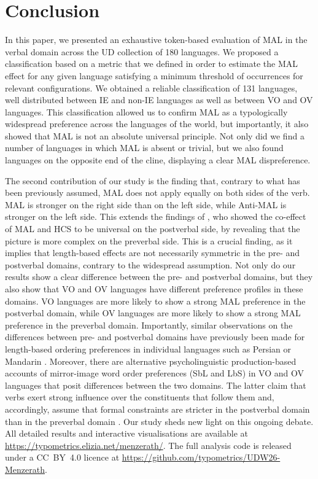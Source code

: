 \section{Conclusion}\label{concl}
In this paper, we presented an exhaustive token-based evaluation of MAL in the verbal domain across the UD collection of 180 languages. We proposed a classification based on a metric that we defined in order to estimate the MAL effect for any given language satisfying a minimum threshold of occurrences for relevant configurations. We obtained a reliable classification of 131 languages, well distributed between IE and non-IE languages as well as between VO and OV languages. This classification allowed us to confirm MAL as a typologically widespread preference across the languages of the world, but importantly, it also showed that MAL is not an absolute universal principle. Not only did we find a number of languages in which MAL is absent or trivial, but we also found languages on the opposite end of the cline, displaying a clear MAL dispreference.

The second contribution of our study is the finding that, contrary to what has been previously assumed, MAL does not apply equally on both sides of the verb. MAL is stronger on the right side than on the left side, while Anti-MAL is stronger on the left side. This extends the findings of \citet{chen2022co}, who showed the co-effect of MAL and HCS to be universal on the postverbal side, by revealing that the picture is more complex on the preverbal side. This is a crucial finding, as it implies that length-based effects are not necessarily symmetric in the pre- and postverbal domains, contrary to the widespread assumption. Not only do our results show a clear difference between the pre- and postverbal domains, but they also show that VO and OV languages have different preference profiles in these domains. VO languages are more likely to show a strong MAL preference in the postverbal domain, while OV languages are more likely to show a strong MAL preference in the preverbal domain. Importantly, similar observations on the differences between pre- and postverbal domains have previously been made for length-based ordering preferences in individual languages such as Persian \citep{faghiriGlossa2020} or Mandarin \citep{Yao2018}. Moreover, there are alternative psycholinguistic production-based accounts of mirror-image word order preferences (SbL and LbS) in VO and OV languages that posit differences between the two domains. The latter claim that verbs exert strong influence over the constituents that follow them and, accordingly, assume that formal constraints are stricter in the postverbal domain than in the preverbal domain \citep{StallingsEtal}. Our study sheds new light on this ongoing debate.
All detailed results and interactive visualisations are available at \url{https://typometrics.elizia.net/menzerath/}. The full analysis code is released under a CC~BY~4.0 licence at \url{https://github.com/typometrics/UDW26-Menzerath}.
